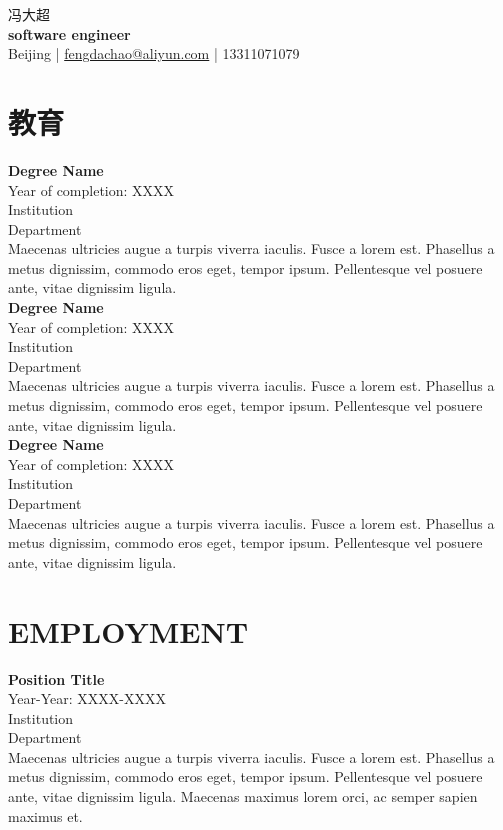 \documentclass[a4paper,9pt]{extarticle}
\begin{document}
\pagestyle{empty}

\begin{center}
冯大超\\[3pt] %
\textbf{software engineer}\\[1pt] %
Beijing | \href{mailto:fengdachao@aliyun.com}{fengdachao@aliyun.com} | 13311071079 %
\end{center}


\section*{教育}

\noindent
\newline
\textbf{Degree Name} \\
Year of completion: XXXX \\ 
Institution \\ 
Department \\
Maecenas ultricies augue a turpis viverra iaculis. Fusce a lorem est. Phasellus a metus dignissim, commodo eros eget, tempor ipsum. Pellentesque vel posuere ante, vitae dignissim ligula. \\

\noindent
\textbf{Degree Name} \\
Year of completion: XXXX \\ 
Institution \\ 
Department \\
Maecenas ultricies augue a turpis viverra iaculis. Fusce a lorem est. Phasellus a metus dignissim, commodo eros eget, tempor ipsum. Pellentesque vel posuere ante, vitae dignissim ligula. \\

\noindent
\textbf{Degree Name} \\
Year of completion: XXXX \\ 
Institution \\ 
Department  \\
Maecenas ultricies augue a turpis viverra iaculis. Fusce a lorem est. Phasellus a metus dignissim, commodo eros eget, tempor ipsum. Pellentesque vel posuere ante, vitae dignissim ligula. 


\section*{EMPLOYMENT}
\noindent
\newline
\textbf{Position Title} \\
Year-Year: XXXX-XXXX \\
Institution \\ 
Department \\
Maecenas ultricies augue a turpis viverra iaculis. Fusce a lorem est. Phasellus a metus dignissim, commodo eros eget, tempor ipsum. Pellentesque vel posuere ante, vitae dignissim ligula. Maecenas maximus lorem orci, ac semper sapien maximus et. \\ 
\end{document}
